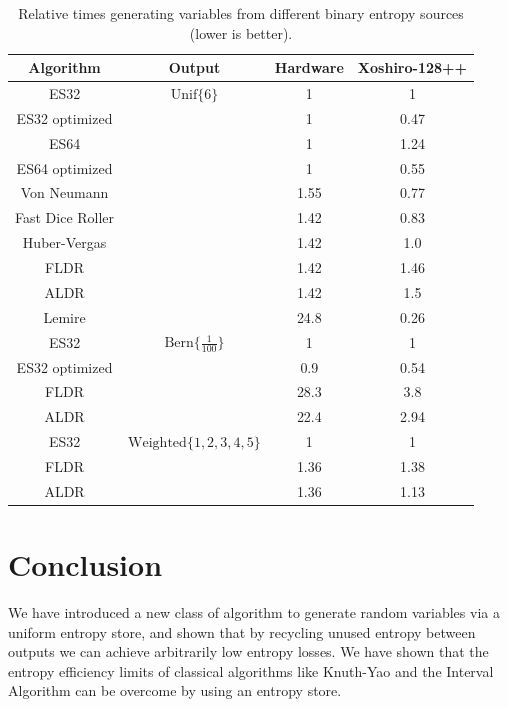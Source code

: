 \documentclass[12pt]{article}
\newcommand{\unif}[1]{\mathrm{Unif}\{#1\}}
\newcommand{\bern}[1]{\mathrm{Bern}\{#1\}}
\begin{document}
\begin{table}[h!]
\centering
\begin{tabular}{|c|c|c|c|}
\hline
Algorithm & Output & Hardware & Xoshiro-128++ \\
\hline
ES32                  & $\unif{6}$ & 1 & 1 \\
ES32 optimized        &  & 1 & 0.47 \\
ES64                  & & 1 & 1.24 \\
ES64 optimized        &  & 1 & 0.55 \\
Von Neumann \cite{neumann51}     &  & 1.55 & 0.77 \\
Fast Dice Roller \cite{lumbroso2013optimal} &  & 1.42 & 0.83 \\
Huber-Vergas \cite{huber2024optimalrollingfairdice} &  & 1.42 & 1.0 \\
FLDR \cite{saad2020fldr} &  & 1.42 & 1.46 \\
ALDR \cite{saad2025} &  & 1.42 & 1.5 \\
Lemire \cite{lemire2019fast} & & 24.8 & 0.26 \\
\hline

ES32                  & $\bern{\frac{1}{100}}$ & 1 & 1 \\
ES32 optimized        &  & 0.9 & 0.54 \\
FLDR                  &  & 28.3 & 3.8 \\
ALDR                  &  & 22.4 & 2.94 \\

\hline

ES32                  & $\mathrm{Weighted}\{1,2,3,4,5\}$ & 1 & 1 \\
FLDR                  &  & 1.36 & 1.38 \\
ALDR                  & & 1.36 & 1.13 \\

\hline

\end{tabular}
\caption{Relative times generating variables from different binary entropy sources (lower is better).}
    \label{tab:speed}
\end{table}



\section{Conclusion}

We have introduced a new class of algorithm to generate random variables via a uniform entropy store, and shown that by recycling unused entropy between outputs we can achieve arbitrarily low entropy losses. We have shown that the entropy efficiency limits of classical algorithms like Knuth-Yao and the Interval Algorithm can be overcome by using an entropy store. 
\end{document}
